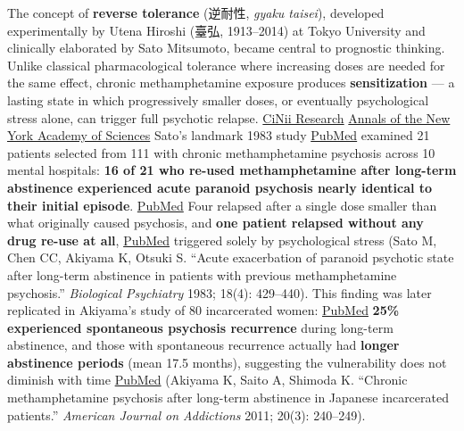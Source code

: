 The concept of \textbf{reverse tolerance} (逆耐性, \emph{gyaku taisei}), developed experimentally by Utena Hiroshi (臺弘, 1913--2014) at Tokyo University and clinically elaborated by Sato Mitsumoto, became central to prognostic thinking. Unlike classical pharmacological tolerance where increasing doses are needed for the same effect, chronic methamphetamine exposure produces \textbf{sensitization} --- a lasting state in which progressively smaller doses, or eventually psychological stress alone, can trigger full psychotic relapse. \href{https://cir.nii.ac.jp/crid/1050001338388511744}{CiNii Research} \href{https://nyaspubs.onlinelibrary.wiley.com/doi/abs/10.1196/annals.1316.035}{Annals of the New York Academy of Sciences} Sato's landmark 1983 study \href{https://pubmed.ncbi.nlm.nih.gov/1553491/}{PubMed} examined 21 patients selected from 111 with chronic methamphetamine psychosis across 10 mental hospitals: \textbf{16 of 21 who re-used methamphetamine after long-term abstinence experienced acute paranoid psychosis nearly identical to their initial episode}. \href{https://pubmed.ncbi.nlm.nih.gov/1553491/}{PubMed} Four relapsed after a single dose smaller than what originally caused psychosis, and \textbf{one patient relapsed without any drug re-use at all}, \href{https://pubmed.ncbi.nlm.nih.gov/6860719/}{PubMed} triggered solely by psychological stress (Sato M, Chen CC, Akiyama K, Otsuki S. ``Acute exacerbation of paranoid psychotic state after long-term abstinence in patients with previous methamphetamine psychosis.'' \emph{Biological Psychiatry} 1983; 18(4): 429--440). This finding was later replicated in Akiyama's study of 80 incarcerated women: \href{https://pubmed.ncbi.nlm.nih.gov/21477052/}{PubMed} \textbf{25\% experienced spontaneous psychosis recurrence} during long-term abstinence, and those with spontaneous recurrence actually had \textbf{longer abstinence periods} (mean 17.5 months), suggesting the vulnerability does not diminish with time \href{https://pubmed.ncbi.nlm.nih.gov/21477052/}{PubMed} (Akiyama K, Saito A, Shimoda K. ``Chronic methamphetamine psychosis after long-term abstinence in Japanese incarcerated patients.'' \emph{American Journal on Addictions} 2011; 20(3): 240--249).

